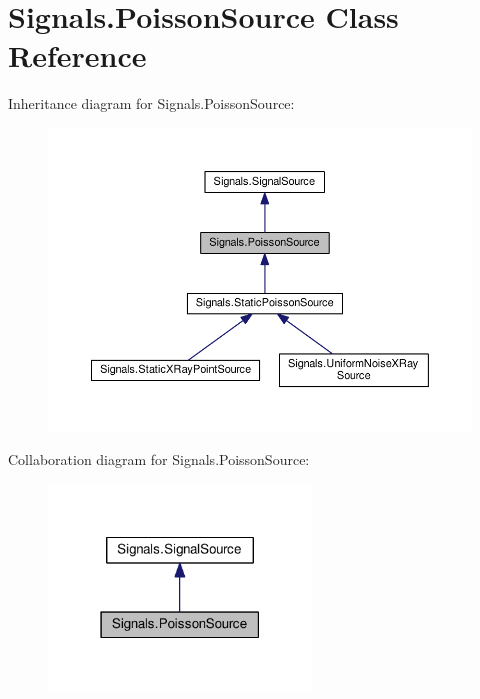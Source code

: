 \hypertarget{classSignals_1_1PoissonSource}{}\section{Signals.\+Poisson\+Source Class Reference}
\label{classSignals_1_1PoissonSource}


Inheritance diagram for Signals.\+Poisson\+Source\+:\nopagebreak
\begin{figure}[H]
\begin{center}
\leavevmode
\includegraphics[width=350pt]{classSignals_1_1PoissonSource__inherit__graph}
\end{center}
\end{figure}


Collaboration diagram for Signals.\+Poisson\+Source\+:\nopagebreak
\begin{figure}[H]
\begin{center}
\leavevmode
\includegraphics[width=198pt]{classSignals_1_1PoissonSource__coll__graph}
\end{center}
\end{figure}
